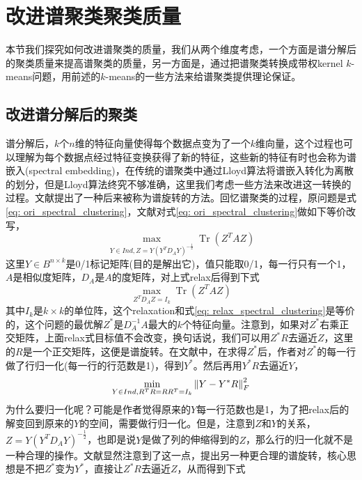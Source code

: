 \section{改进谱聚类聚类质量}
本节我们探究如何改进谱聚类的质量，我们从两个维度考虑，一个方面是谱分解后的聚类质量来提高谱聚类的质量，另一方面是，通过把谱聚类转换成带权kernel $k$-means问题，用前述的$k$-means的一些方法来给谱聚类提供理论保证。

\subsection{改进谱分解后的聚类}
谱分解后，$k$个$n$维的特征向量使得每个数据点变为了一个$k$维向量，这个过程也可以理解为每个数据点经过特征变换获得了新的特征，这些新的特征有时也会称为谱嵌入(spectral embedding)，在传统的谱聚类中通过Lloyd算法将谱嵌入转化为离散的划分，但是Lloyd算法终究不够准确，这里我们考虑一些方法来改进这一转换的过程。文献\cite{stella2003multiclass}提出了一种后来被称为谱旋转的方法。回忆谱聚类的过程，原问题是式\ref{eq: ori_spectral_clustering}，文献\cite{stella2003multiclass}对式\ref{eq: ori_spectral_clustering}做如下等价改写，
\begin{equation*}
	\max _{Y \in I n d, Z=Y\left(Y^{T} D_{A} Y\right)^{-\frac{1}{2}}} \operatorname{Tr}\left(Z^{T} A Z\right)
\end{equation*}
这里$Y \in B^{n \times k}$是0/1标记矩阵(目的是解出它)，值只能取0/1，每一行只有一个1，$A$是相似度矩阵，$D_A$是$A$的度矩阵，对上式relax后得到下式
\begin{equation*}
	\max _{Z^{T} D_{A} Z=I_{k}} \operatorname{Tr}\left(Z^{T} A Z\right)
\end{equation*}
其中$I_k$是$k\times k$的单位阵，这个relaxation和式\ref{eq: relax_spectral_clustering}是等价的，这个问题的最优解$Z^*$是$D_A^{-1}A$最大的$k$个特征向量。注意到，如果对$Z^*$右乘正交矩阵，上面relax式目标值不会改变，换句话说，我们可以用$Z^*R$去逼近$Z$，这里的$R$是一个正交矩阵，这便是谱旋转。在文献\cite{stella2003multiclass}中，在求得$Z^*$后，作者对$Z^*$的每一行做了行归一化(每一行的行范数是1)，得到$Y^*$。然后再用$Y^*R$去逼近$Y$，
\begin{equation*}
 	\min_{Y \in I n d,R^TR = RR^T = I_k} \left\lVert Y - Y^*R\right\rVert_F^2
\end{equation*}
为什么要归一化呢？可能是作者觉得原来的$Y$每一行范数也是1，为了把relax后的解变回到原来的$Y$的空间，需要做行归一化。但是，注意到$Z$和$Y$的关系，$Z=Y\left(Y^{T} D_{A} Y\right)^{-\frac{1}{2}}$，也即是说$Y$是做了列的伸缩得到的$Z$，那么行的归一化就不是一种合理的操作。文献\cite{chen2017scalable}显然注意到了这一点，提出另一种更合理的谱旋转，核心思想是不把$Z^*$变为$Y^*$，直接让$Z^*R$去逼近$Z$，从而得到下式
